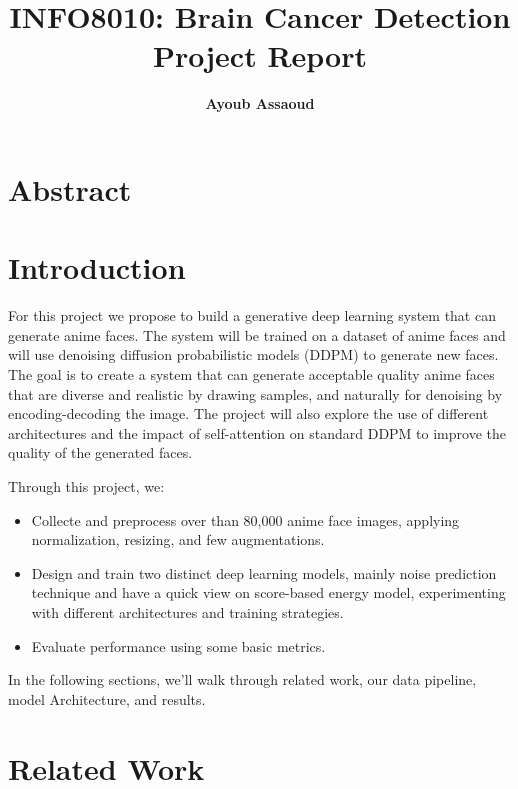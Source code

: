 \documentclass[twocolumn,superscriptaddress,aps]{revtex4-1}
\begin{document}

\title{\Large{INFO8010: Brain Cancer Detection Project Report}}
\vspace{1cm}
\author{\small{\bf Ayoub Assaoud}}

\maketitle
\section{Abstract}

\section{Introduction}

For this project we propose to build a generative deep learning system that can generate anime faces. The system will be trained on a dataset of anime faces and will use denoising diffusion probabilistic models (DDPM) to generate new faces. The goal is to create a system that can generate acceptable quality anime faces that are diverse and realistic by drawing samples, and naturally for denoising by encoding-decoding the image. The project will also explore the use of different architectures and the impact of self-attention on standard DDPM to improve the quality of the generated faces.

Through this project, we:

\begin{itemize}
	\item Collecte and preprocess over than 80,000 anime face images, applying normalization, resizing, and few augmentations.
	\item Design and train two distinct deep learning models, mainly noise prediction technique and have a quick view on score-based energy model, experimenting with different architectures and training strategies.
	\item Evaluate performance using some basic metrics.
\end{itemize}
In the following sections, we'll walk through related work, our data pipeline, model Architecture, and results.

\section{Related Work}
\end{document}
